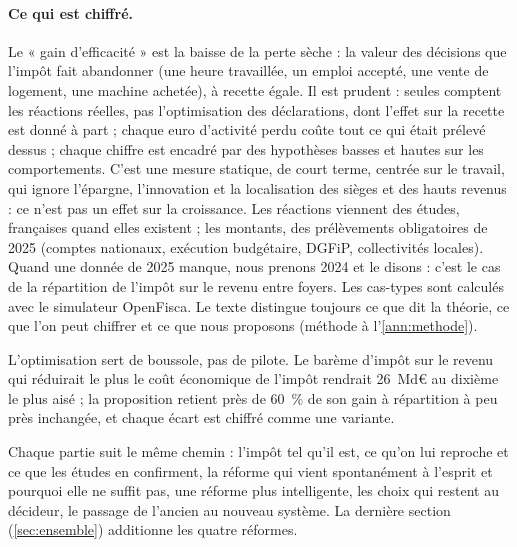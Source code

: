 \paragraph{Ce qui est chiffré.} Le « gain d'efficacité » est la baisse de la perte sèche : la valeur des décisions que
l'impôt fait abandonner (une heure travaillée, un emploi accepté, une vente de logement, une machine achetée), à recette
égale. Il est prudent : seules comptent les réactions réelles, pas l'optimisation des déclarations, dont l'effet sur la
recette est donné à part ; chaque euro d'activité perdu coûte tout ce qui était prélevé dessus ; chaque chiffre est
encadré par des hypothèses basses et hautes sur les comportements. C'est une mesure statique, de court terme, centrée
sur le travail, qui ignore l'épargne, l'innovation et la localisation des sièges et des hauts revenus : ce n'est pas un
effet sur la croissance. Les réactions viennent des études, françaises quand elles existent ; les montants, des
prélèvements obligatoires de 2025 (comptes nationaux, exécution budgétaire, DGFiP, collectivités locales). Quand une
donnée de 2025 manque, nous prenons 2024 et le disons : c'est le cas de la répartition de l'impôt sur le revenu entre
foyers. Les cas-types sont calculés avec le simulateur OpenFisca. Le texte distingue toujours ce que dit la théorie, ce
que l'on peut chiffrer et ce que nous proposons (méthode à l'\ref{ann:methode}).

L'optimisation sert de boussole, pas de pilote. Le barème d'impôt sur le revenu qui réduirait le plus le coût
économique de l'impôt rendrait 26~Md€ au dixième le plus aisé ; la proposition retient près de 60~\% de son gain à
répartition à peu près inchangée, et chaque écart est chiffré comme une variante.

Chaque partie suit le même chemin : l'impôt tel qu'il est, ce qu'on lui reproche et ce que les études en confirment, la
réforme qui vient spontanément à l'esprit et pourquoi elle ne suffit pas, une réforme plus intelligente, les choix qui
restent au décideur, le passage de l'ancien au nouveau système. La dernière section (\ref{sec:ensemble}) additionne les
quatre réformes.
